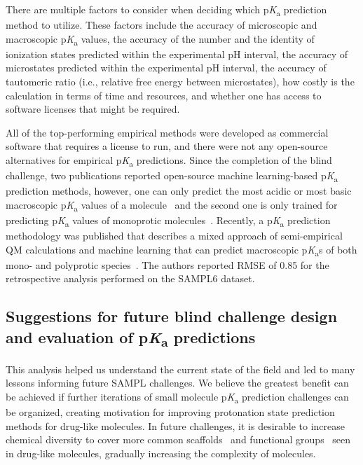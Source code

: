 \documentclass[9pt,lineno,final]{elife}
\newcommand{\pKa}{p\textit{K}\textsubscript{a}}
\begin{document}
There are multiple factors to consider when deciding which \pKa{} prediction method to utilize. 
These factors include the accuracy of microscopic and macroscopic \pKa{} values, the accuracy of the number and the identity of ionization states predicted within the experimental pH interval, the accuracy of microstates predicted within the experimental pH interval, the accuracy of tautomeric ratio (i.e., relative free energy between microstates), how costly is the calculation in terms of time and resources, and whether one has access to software licenses that might be required. 

All of the top-performing empirical methods were developed as commercial software that requires a license to run, and there were not any open-source alternatives for empirical \pKa{} predictions. 
Since the completion of the blind challenge, two publications reported open-source machine learning-based \pKa{} prediction methods, however, one can only predict the most acidic or most basic macroscopic \pKa{} values of a molecule~\citep{Mansouri:2019:J.Cheminformatics} and the second one is only trained for predicting \pKa{} values of monoprotic molecules~\citep{Baltruschat:2020:F1000Research}. 
Recently, a \pKa{} prediction methodology was published that describes a mixed approach of semi-empirical QM calculations and machine learning that can predict macroscopic \pKa{}s of both mono- and polyprotic species~\citep{Hunt:2020:J.Chem.Inf.Model.}. 
The authors reported RMSE of 0.85 for the retrospective analysis performed on the SAMPL6 dataset.



\subsection{Suggestions for future blind challenge design and evaluation of \pKa{} predictions}

This analysis helped us understand the current state of the field and led to many lessons informing future SAMPL challenges. 
We believe the greatest benefit can be achieved if further iterations of small molecule \pKa{} prediction challenges can be organized, creating motivation for improving protonation state prediction methods for drug-like molecules. 
In future challenges, it is desirable to increase chemical diversity to cover more common scaffolds~\citep{Zdrazil:2018:J.Med.Chem.} and functional groups~\citep{Ertl:2020:J.Med.Chem.} seen in drug-like molecules, gradually increasing the complexity of molecules.
\end{document}
